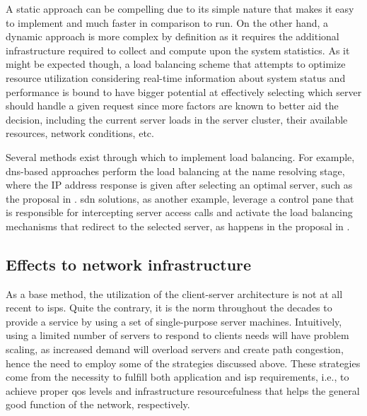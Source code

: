     A static approach can be compelling due to its simple nature that makes it easy to implement and much faster in comparison to run.
    On the other hand, a dynamic approach is more complex by definition as it requires the additional infrastructure required to collect and compute upon the system statistics.
    As it might be expected though, a load balancing scheme that attempts to optimize resource utilization considering real-time information about system status and performance is bound to have bigger potential at effectively selecting which server should handle a given request since more factors are known to better aid the decision, including the current server loads in the server cluster, their available resources, network conditions, etc.

    Several methods exist through which to implement load balancing.
    For example, \gls{dns}-based approaches perform the load balancing at the name resolving stage, where the IP address response is given after selecting an optimal server, such as the proposal in \cite{dns-load-balancing}.
    \gls{sdn} solutions, as another example, leverage a control pane that is responsible for intercepting server access calls and activate the load balancing mechanisms that redirect to the selected server, as happens in the proposal in \cite{sdn-load-balancing}.


\subsection{Effects to network infrastructure}

\label{ssec:p2p-effects}

    As a base method, the utilization of the client-server architecture is not at all recent to \glspl{isp}.
    Quite the contrary, it is the norm throughout the decades to provide a service by using a set of single-purpose server machines.
    Intuitively, using a limited number of servers to respond to clients needs will have problem scaling, as increased demand will overload servers and create path congestion, hence the need to employ some of the strategies discussed above.
    These strategies come from the necessity to fulfill both application and \gls{isp} requirements, i.e., to achieve proper \gls{qos} levels and infrastructure resourcefulness that helps the general good function of the network, respectively.

